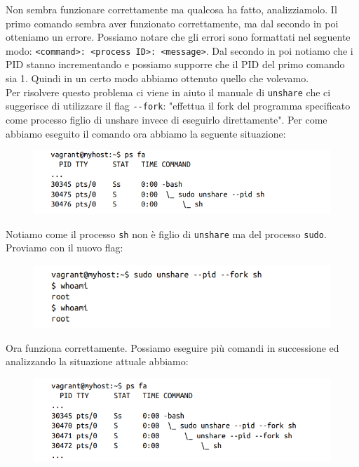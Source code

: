 Non sembra funzionare correttamente ma qualcosa ha fatto, analizziamolo.
Il primo comando sembra aver funzionato correttamente, ma dal secondo in poi
otteniamo un errore. Possiamo notare che gli errori sono formattati nel seguente modo:
\verb|<command>: <process ID>: <message>|. Dal secondo in poi notiamo che i PID
stanno incrementando e possiamo supporre che il PID del primo comando sia 1. Quindi
in un certo modo abbiamo ottenuto quello che volevamo.\\
Per risolvere questo problema ci viene in aiuto il manuale di \verb|unshare| che ci
suggerisce di utilizzare il flag \verb|--fork|: "effettua il fork del programma
specificato come processo figlio di unshare invece di eseguirlo direttamente".
Per come abbiamo eseguito il comando ora abbiamo la seguente situazione:

\begin{figure}[H]
    \centering
    \includegraphics[width=12cm, keepaspectratio]{capitoli/os_security/imgs/pid2.png}
\end{figure}

Notiamo come il processo \verb|sh| non è figlio di \verb|unshare| ma del processo
\verb|sudo|.\\

Proviamo con il nuovo flag:

\begin{figure}[H]
    \centering
    \includegraphics[width=12cm, keepaspectratio]{capitoli/os_security/imgs/pid3.png}
\end{figure}

Ora funziona correttamente. Possiamo eseguire più comandi in successione ed
analizzando la situazione attuale abbiamo:

\begin{figure}[H]
    \centering
    \includegraphics[width=12cm, keepaspectratio]{capitoli/os_security/imgs/pid4.png}
\end{figure}

